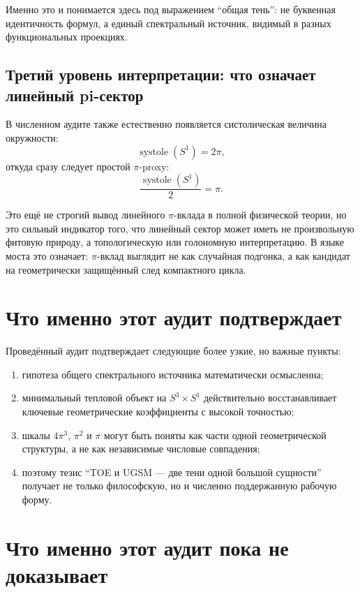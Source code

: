 \documentclass[12pt,a4paper]{article}
\begin{document}
Именно это и понимается здесь под выражением ``общая тень'': не буквенная идентичность формул, а единый спектральный источник, видимый в разных функциональных проекциях.

\subsection{Третий уровень интерпретации: что означает линейный pi-сектор}

В численном аудите также естественно появляется систолическая величина окружности:
\[
\operatorname{systole}(S^1)=2\pi,
\]
откуда сразу следует простой \(\pi\)-proxy:
\[
\frac{\operatorname{systole}(S^1)}{2}=\pi.
\]

Это ещё не строгий вывод линейного \(\pi\)-вклада в полной физической теории, но это сильный индикатор того, что линейный сектор может иметь не произвольную фитовую природу, а топологическую или голономную интерпретацию. В языке моста это означает: \(\pi\)-вклад выглядит не как случайная подгонка, а как кандидат на геометрически защищённый след компактного цикла.

\section{Что именно этот аудит подтверждает}

Проведённый аудит подтверждает следующие более узкие, но важные пункты:
\begin{enumerate}
    \item гипотеза общего спектрального источника математически осмысленна;
    \item минимальный тепловой объект на \(S^3\times S^1\) действительно восстанавливает ключевые геометрические коэффициенты с высокой точностью;
    \item шкалы \(4\pi^3\), \(\pi^2\) и \(\pi\) могут быть поняты как части одной геометрической структуры, а не как независимые числовые совпадения;
    \item поэтому тезис ``TOE и UGSM --- две тени одной большой сущности'' получает не только философскую, но и численно поддержанную рабочую форму.
\end{enumerate}

\section{Что именно этот аудит пока не доказывает}
\end{document}
